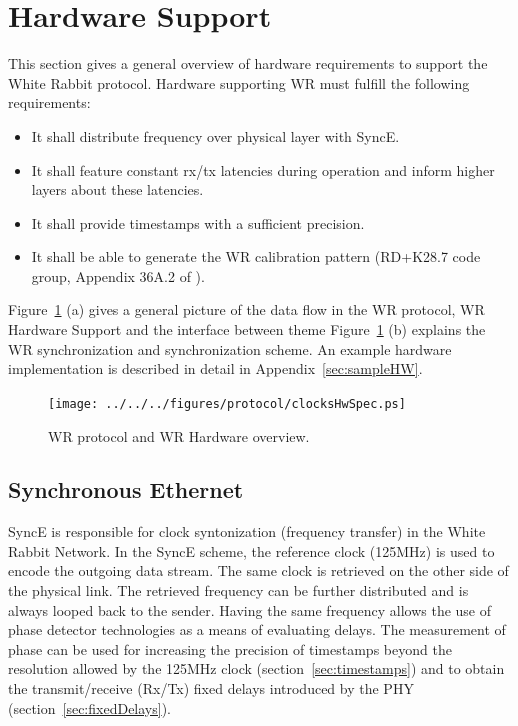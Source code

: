 \documentclass[a4paper, 12pt]{article}
\begin{document}
\newpage

\section{Hardware Support}
\label{sec:hw}


This section gives a general overview of hardware requirements to support the White Rabbit protocol. 
Hardware supporting WR must fulfill the following requirements:
\begin{itemize}
  \item It shall distribute frequency over physical layer with SyncE.
  \item It shall feature constant rx/tx latencies during operation and inform higher layers 
	about these latencies.
  \item It shall provide timestamps with a sufficient precision. 
  \item It shall be able to generate the WR calibration pattern 
	(RD+K28.7 code group, Appendix 36A.2 of \cite{IEEE802.3}).
\end{itemize}

Figure~\ref{fig:clocksHwSpec} (a) gives a general picture of the data flow in the WR 
protocol, WR Hardware Support and the interface between theme
Figure~\ref{fig:clocksHwSpec} (b) explains the WR synchronization and synchronization scheme.
An example hardware implementation is described in detail in Appendix~\ref{sec:sampleHW}.

\begin{figure}[ht!]
  \centering
  \texttt{[image: ../../../figures/protocol/clocksHwSpec.ps]}
  \caption{WR protocol and WR Hardware overview.}
  \label{fig:clocksHwSpec}
\end{figure}


\subsection{Synchronous Ethernet}
\label{sec:syncE}
SyncE is responsible for clock syntonization (frequency transfer) in the White Rabbit Network. 
In the SyncE scheme, the reference clock (125MHz) is used to encode the outgoing data
stream. The same clock is retrieved on the other side of the physical link.
The retrieved frequency can be further distributed and is always looped back to the sender.
Having the same frequency allows the use of phase detector technologies as a means of evaluating
delays. The measurement of phase can be used for increasing the precision of timestamps 
beyond the resolution allowed by the 125MHz clock (section~\ref{sec:timestamps}) and to obtain 
the transmit/receive (Rx/Tx) fixed delays introduced by the PHY (section~\ref{sec:fixedDelays}).
\end{document}

